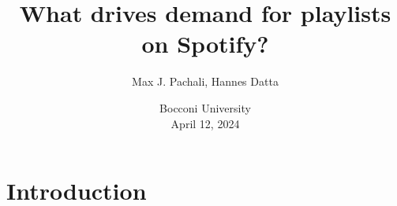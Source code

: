 \documentclass[8pt]{beamer}
\title{What drives demand for playlists on Spotify?}
\author[shortname]{Max J. Pachali\inst{1}, Hannes Datta\inst{1}}
\institute[shortinst]{\inst{1} Tilburg University, The Netherlands}
\date{
 Bocconi University \\
 April 12, 2024
}
\begin{document}


\begin{frame}[label=shortversion]

\titlepage

\end{frame}





\section{Introduction}
\end{document}
